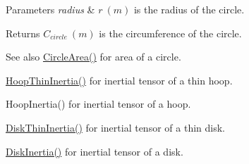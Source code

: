 \begin{DoxyParams}{Parameters}
{\em radius} & $ r\ (m)$ is the radius of the circle. \\
\hline
\end{DoxyParams}
\begin{DoxyReturn}{Returns}
$ C_{circle}\ (m)$ is the circumference of the circle. 
\end{DoxyReturn}
\begin{DoxySeeAlso}{See also}
\mbox{\hyperlink{group___e_g_x_math-_geometry-2_d-_circle_gabf5aadec991cc2bbf9d74fd83c46f40d}{Circle\+Area()}} for area of a circle. 

\mbox{\hyperlink{group___e_g_x_math-_geometry-3_d-_hoop_gab3a84dc2aa29ce0db990425747d291c6}{Hoop\+Thin\+Inertia()}} for inertial tensor of a thin hoop. 

Hoop\+Inertia() for inertial tensor of a hoop. 

\mbox{\hyperlink{group___e_g_x_math-_geometry-3_d-_disk_ga8dcadf6cd5680294a84311c6767e3caf}{Disk\+Thin\+Inertia()}} for inertial tensor of a thin disk. 

\mbox{\hyperlink{group___e_g_x_math-_geometry-3_d-_disk_ga6ed461694b277e36a641a6550bdea68f}{Disk\+Inertia()}} for inertial tensor of a disk. 
\end{DoxySeeAlso}
